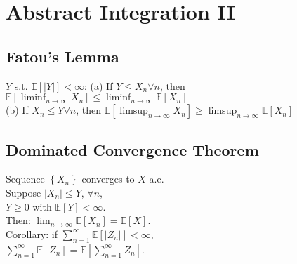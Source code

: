 \section{Abstract Integration II}
	
	\subsection*{Fatou's Lemma}
	$Y$ s.t. $\mathbb{E}\left[\left|Y\right|\right] < \infty$:
	(a) If $Y\leq X_{n}\forall n$, then $\mathbb{E}\left[\liminf_{n\to\infty}X_{n}\right]\leq\liminf_{n\to\infty}\mathbb{E}\left[X_{n}\right]$\\
	(b) If $X_{n}\leq Y\forall n$, then $\mathbb{E}\left[\limsup_{n\to\infty}X_{n}\right]\geq\limsup_{n\to\infty}\mathbb{E}\left[X_{n}\right]$
	
	\subsection*{Dominated Convergence Theorem}
	Sequence $\left\{X_{n}\right\}$ converges to $X$ a.e.\\
	Suppose $\left|X_{n}\right|\leq Y$, $\forall n$,\\
	$Y\geq 0$ with $\mathbb{E}\left[Y\right] < \infty$.\\
	Then: $\lim_{n\to\infty}\mathbb{E}\left[X_{n}\right] = \mathbb{E}\left[X\right]$.\\
	Corollary: if $\sum_{n=1}^{\infty}\mathbb{E}\left[\left|Z_{n}\right|\right] < \infty$,\\
	$\sum_{n=1}^{\infty}\mathbb{E}\left[Z_{n}\right] = \mathbb{E}\left[\sum_{n=1}^{\infty}Z_{n}\right]$.
	